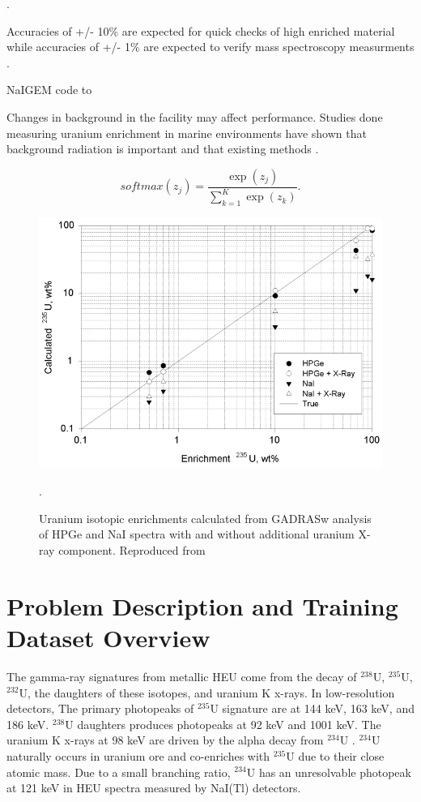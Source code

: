  \cite{VESTERLUND2013}.

Accuracies of +/- 10\% are expected for quick checks of high enriched material while accuracies of +/- 1\% are expected to verify mass spectroscopy measurments \cite{Kull1974}.


NaIGEM code to \cite{MORTREAU2004} 


Changes in background in the facility may affect performance. Studies done measuring uranium enrichment in marine environments have shown that background radiation is important and that existing methods  \cite{Hofstetter2008}.


\begin{equation} \label{eq:uenrichment}
softmax(z_j) = \frac{\exp(z_j)} {\sum_{k=1}^{K} \exp(z_k)}.
\end{equation}

\begin{figure}[H]
	\centering
	\includegraphics[width=0.99\linewidth]{images/GADRAS_enrichment_hofstetter}
	\caption{Uranium isotopic enrichments calculated from GADRASw analysis of HPGe and NaI spectra with and without additional uranium X-ray component. Reproduced from \cite{Hofstetter2008}}.
	\label{fig:GADRAS_enrichment_hofstetter}
\end{figure}


\section{Problem Description and Training Dataset Overview}

The gamma-ray signatures from metallic HEU come from the decay of $^{238}$U, $^{235}$U, $^{232}$U, the daughters of these isotopes, and uranium K x-rays. In low-resolution detectors, The primary photopeaks of $^{235}$U signature are at 144 keV, 163 keV, and 186 keV. $^{238}$U daughters produces photopeaks at 92 keV and 1001 keV. The uranium K x-rays at 98 keV are driven by the alpha decay from $^{234}$U \cite{Hofstetter2008}. $^{234}$U naturally occurs in uranium ore and co-enriches with $^{235}$U due to their close atomic mass. Due to a small branching ratio, $^{234}$U has an unresolvable photopeak at 121 keV in HEU spectra measured by NaI(Tl) detectors.

